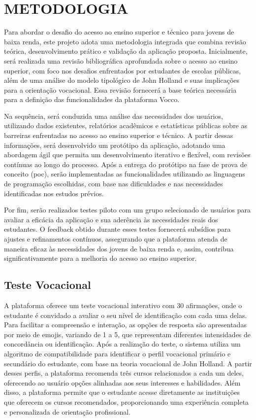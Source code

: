 
\chapter{METODOLOGIA}
\label{fases-da-disciplina}

Para abordar o desafio do acesso ao ensino superior e técnico para jovens de baixa renda, este projeto adota uma metodologia integrada que combina revisão teórica, desenvolvimento prático e validação da aplicação proposta. Inicialmente, será realizada uma revisão bibliográfica aprofundada sobre o acesso ao ensino superior, com foco nos desafios enfrentados por estudantes de escolas públicas, além de uma análise do modelo tipológico de John Holland e suas implicações para a orientação vocacional. Essa revisão fornecerá a base teórica necessária para a definição das funcionalidades da plataforma Vocco.

Na sequência, será conduzida uma análise das necessidades dos usuários, utilizando dados existentes, relatórios acadêmicos e estatísticas públicas sobre as barreiras enfrentadas no acesso ao ensino superior e técnico. A partir dessas informações, será desenvolvido um protótipo da aplicação, adotando uma abordagem ágil que permita um desenvolvimento iterativo e flexível, com revisões contínuas ao longo do processo. Após a entrega do protótipo na fase de prova de conceito (\ac{poc}), serão implementadas as funcionalidades utilizando as linguagens de programação escolhidas, com base nas dificuldades e nas necessidades identificadas nos estudos prévios.

Por fim, serão realizados testes piloto com um grupo selecionado de usuários para avaliar a eficácia da aplicação e sua aderência às necessidades reais dos estudantes. O feedback obtido durante esses testes fornecerá subsídios para ajustes e refinamentos contínuos, assegurando que a plataforma atenda de maneira eficaz às necessidades dos jovens de baixa renda e, assim, contribua significativamente para a melhoria do acesso ao ensino superior.


\section{Teste Vocacional}

A plataforma oferece um teste vocacional interativo com 30 afirmações, onde o estudante é convidado a avaliar o seu nível de identificação com cada uma delas. Para facilitar a compreensão e interação, as opções de resposta são apresentadas por meio de emojis, variando de 1 a 5, que representam diferentes intensidades de concordância ou identificação. Após a realização do teste, o sistema utiliza um algoritmo de compatibilidade para identificar o perfil vocacional primário e secundário do estudante, com base na teoria vocacional de John Holland. A partir desses perfis, a plataforma recomenda três cursos relacionados a cada um deles, oferecendo ao usuário opções alinhadas aos seus interesses e habilidades. Além disso, a plataforma permite que o estudante acesse diretamente as instituições que oferecem os cursos recomendados, proporcionando uma experiência completa e personalizada de orientação profissional.

